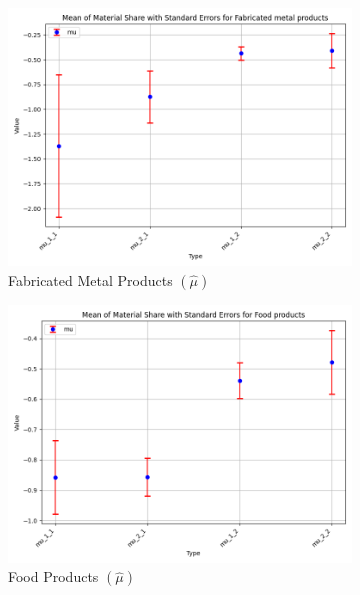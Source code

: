 \documentclass{article}
\begin{document}
\begin{figure}[ht!]
    \begin{subfigure}[t]{0.32\textwidth}
        \centering
        \includegraphics[width=\textwidth]{figure/empirical_ar1_mixture_mu_with_error_bars_Fabricated metal products.png}
        \caption{Fabricated Metal Products $(\hat\mu)$}
    \end{subfigure}
    \begin{subfigure}[t]{0.32\textwidth}
        \centering
        \includegraphics[width=\textwidth]{figure/empirical_ar1_mixture_mu_with_error_bars_Food products.png}
        \caption{Food Products $(\hat\mu)$}
    \end{subfigure}
    \begin{subfigure}[t]{0.32\textwidth}
        \centering

\end{subfigure}
\end{figure}
\end{document}
